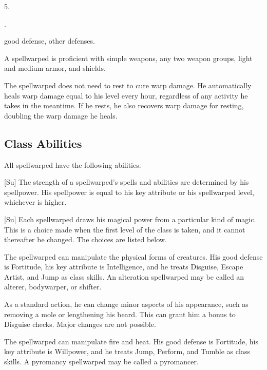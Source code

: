         5.

         .

          good defense,  other defenses.

        A spellwarped is proficient with simple weapons, any two weapon groups, light and medium armor, and shields.

        The spellwarped does not need to rest to cure warp damage.
        He automatically heals warp damage equal to his level every hour, regardless of any activity he takes in the meantime.
        If he rests, he also recovers warp damage for resting, doubling the warp damage he heals.

    \subsection{Class Abilities}
        All spellwarped have the following abilities.

        [Su]
        The strength of a spellwarped's spells and abilities are determined by his spellpower.
        His spellpower is equal to his key attribute or his spellwarped level, whichever is higher.

        [Su]
        Each spellwarped draws his magical power from a particular kind of magic.
        This is a choice made when the first level of the class is taken, and it cannot thereafter be changed.
        The choices are listed below.

        The spellwarped can manipulate the physical forms of creatures.
        His good defense is Fortitude, his key attribute is Intelligence, and he treats Disguise, Escape Artist, and Jump as class skills.
        An alteration spellwarped may be called an alterer, bodywarper, or shifter.

        As a standard action, he can change minor aspects of his appearance, such as removing a mole or lengthening his beard.
        This can grant him a  bonus to Disguise checks.
        Major changes are not possible.

        The spellwarped can manipulate fire and heat.
        His good defense is Fortitude, his key attribute is Willpower, and he treats Jump, Perform, and Tumble as class skills.
        A pyromancy spellwarped may be called a pyromancer.


